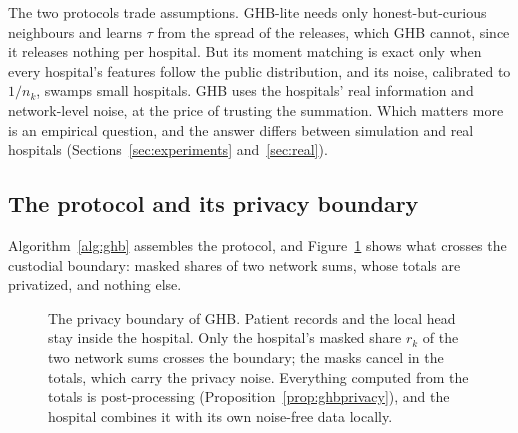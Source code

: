 \documentclass[acmsmall,screen,review]{acmart}
\theoremstyle{acmdefinition}
\begin{document}
The two protocols trade assumptions. GHB-lite needs only honest-but-curious neighbours and learns $\tau$ from the spread of the releases, which GHB cannot, since it releases nothing per hospital. But its moment matching is exact only when every hospital's features follow the public distribution, and its noise, calibrated to $1/n_k$, swamps small hospitals. GHB uses the hospitals' real information and network-level noise, at the price of trusting the summation. Which matters more is an empirical question, and the answer differs between simulation and real hospitals (Sections~\ref{sec:experiments} and~\ref{sec:real}).

\subsection{The protocol and its privacy boundary}\label{sec:algorithm}

Algorithm~\ref{alg:ghb} assembles the protocol, and Figure~\ref{fig:boundary} shows what crosses the custodial boundary: masked shares of two network sums, whose totals are privatized, and nothing else.

\begin{figure}[t]
\centering
\resizebox{\linewidth}{!}{}
\caption{The privacy boundary of GHB. Patient records and the local head stay inside the hospital. Only the hospital's masked share $r_k$ of the two network sums crosses the boundary; the masks cancel in the totals, which carry the privacy noise. Everything computed from the totals is post-processing (Proposition~\ref{prop:ghbprivacy}), and the hospital combines it with its own noise-free data locally.}
\label{fig:boundary}
\end{figure}
\end{document}

